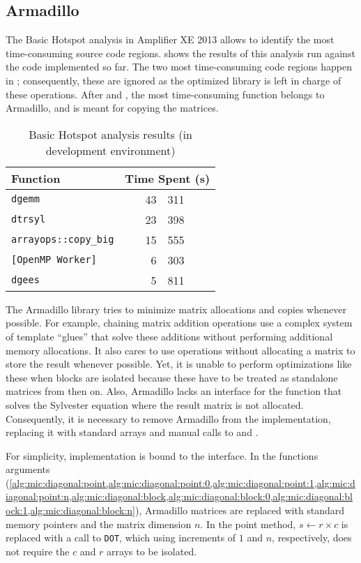 \documentclass[../thesis]{subfiles}
\begin{document}
	\subsection{Armadillo}
	The Basic Hotspot analysis in \intel\vtune Amplifier XE 2013 allows to identify the most time-consuming source code regions.  shows the results of this analysis run against the code implemented so far. The two most time-consuming code regions happen in \mkl; consequently, these are ignored as the optimized library is left in charge of these operations. After \blas and \lapack, the most time-consuming function belongs to Armadillo, and is meant for copying the matrices.

	\begin{table}[htp]
		\begin{center}
			\begin{tabular}{l|r@{.}l}
				\hline
				Function & \multicolumn{2}{r}{Time Spent (s)} \\
				\hline
				\texttt{dgemm} & 43 & 311  \\
				\texttt{dtrsyl} & 23 & 398  \\
				\texttt{arrayops::copy\_big} & 15 & 555  \\
				\texttt{[OpenMP Worker]} & 6 & 303  \\
				\texttt{dgees} & 5 & 811  \\
				\hline
			\end{tabular}
		\end{center}
		\caption[Basic Hotspot analysis results]{Basic Hotspot analysis results (in development environment)}
		\label{tab:hotspots}
	\end{table}

	The Armadillo library tries to minimize matrix allocations and copies whenever possible. For example, chaining matrix addition operations use a complex system of template ``glues'' that solve these additions without performing additional memory allocations. It also cares to use \blas operations without allocating a matrix to store the result whenever possible. Yet, it is unable to perform optimizations like these when blocks are isolated because these have to be treated as standalone matrices from then on. Also, Armadillo lacks an interface for the \lapack function that solves the Sylvester equation where the result matrix is not allocated. Consequently, it is necessary to remove Armadillo from the implementation, replacing it with standard arrays and manual calls to \blas and \lapack.

	For simplicity, implementation is bound to the \intel\mkl\blas interface. In the functions arguments (\cref{alg:mic:diagonal:point,alg:mic:diagonal:point:0,alg:mic:diagonal:point:1,alg:mic:diagonal:point:n,alg:mic:diagonal:block,alg:mic:diagonal:block:0,alg:mic:diagonal:block:1,alg:mic:diagonal:block:n}), Armadillo matrices are replaced with standard memory pointers and the matrix dimension $n$. In the point method, $s \leftarrow r \times c$ is replaced with a call to \blas\texttt{DOT}, which using increments of $1$ and $n$, respectively, does not require the $c$ and $r$ arrays to be isolated.
\end{document}
